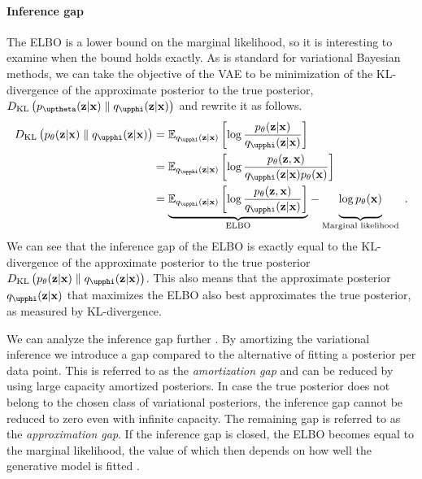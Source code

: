 \paragraph{Inference gap} 
The ELBO is a lower bound on the marginal likelihood, so it is interesting to examine when the bound holds exactly. 
As is standard for variational Bayesian methods, we can take the objective of the VAE to be minimization of the KL-divergence of the approximate posterior to the true posterior, $D_\mathrm{KL}\left( p_\thetab(\zb|\xb) \parallel q_\phib(\zb|\xb) \right)$ and rewrite it as follows.
%
\begin{align}
    D_\text{KL}\left( p_\theta(\zb|\xb) \parallel q_\phib(\zb|\xb) \right)
    &= \mathbb{E}_{q_\phib(\zb|\xb)}\left[ \log \frac{p_\theta(\zb|\xb)}{q_\phib(\zb|\xb)} \right] \nonumber \\
    &= \mathbb{E}_{q_\phib(\zb|\xb)}\left[ \log \frac{p_\theta(\zb,\xb)}{q_\phib(\zb|\xb)p_\theta(\xb)} \right] \nonumber \\
    &= 
    \underset{\text{ELBO}}{\underbrace{
        \mathbb{E}_{q_\phib(\zb|\xb)}\left[ \log \frac{p_\theta(\zb,\xb)}{q_\phib(\zb|\xb)} \right]
    }}
    - 
    \underset{\text{Marginal likelihood}}{\underbrace{
        \vphantom{\mathbb{E}_{q_\phib(\zb|\xb)}\left[ \log \frac{p_\theta(\zb,\xb)}{q_\phib(\zb|\xb)} \right]}{\log p_\theta(\xb)}
    }} \enspace .
\end{align}
%
We can see that the inference gap of the ELBO is exactly equal to the KL-divergence of the approximate posterior to the true posterior $D_\text{KL}\left( p_\theta(\zb|\xb) \parallel q_\phib(\zb|\xb) \right)$. 
This also means that the approximate posterior $q_\phib(\zb|\xb)$ that maximizes the ELBO also best approximates the true posterior, as measured by KL-divergence. 

We can analyze the inference gap further \cite{cremer_inference_2018}. 
By amortizing the variational inference we introduce a gap compared to the alternative of fitting a posterior per data point. %
This is referred to as the \emph{amortization gap} and can be reduced by using large capacity amortized posteriors. 
In case the true posterior does not belong to the chosen class of variational posteriors, the inference gap cannot be reduced to zero even with infinite capacity. The remaining gap is referred to as the \emph{approximation gap}. 
If the inference gap is closed, the ELBO becomes equal to the marginal likelihood, the value of which then depends on how well the generative model is fitted \cite{cremer_inference_2018,frellsen_deep_2019}.

